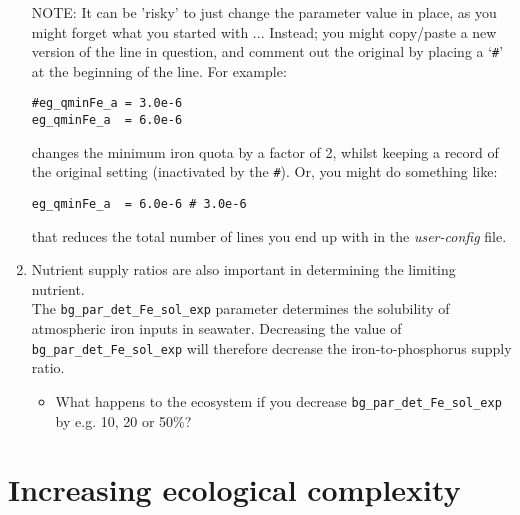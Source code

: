 \documentclass[11pt,fleqn]{book} %
\begin{document}
\begin{enumerate}[noitemsep]
\vspace{1mm}
\item[NOTE:] It can be 'risky' to just change the parameter value in place, as you might forget what you started with ... Instead; you might copy/paste a new version of the line in question, and comment out the original by placing a `\texttt{\#}' at the beginning of the line. For example:
\vspace{-1mm}\small\begin{verbatim}
#eg_qminFe_a = 3.0e-6
eg_qminFe_a  = 6.0e-6
\end{verbatim}\normalsize\vspace{-1mm}
changes the minimum iron quota by a factor of 2, whilst keeping a record of the original setting (inactivated by the \texttt{\#}). Or, you might do something like:
\vspace{-1mm}\small\begin{verbatim}
eg_qminFe_a  = 6.0e-6 # 3.0e-6
\end{verbatim}\normalsize\vspace{-1mm}
that reduces the total number of lines you end up with in the \textit{user-config} file.

\vspace{1mm}
\item Nutrient supply ratios are also important in determining the limiting nutrient.
\\The \texttt{bg\_par\_det\_Fe\_sol\_exp} parameter determines the solubility of atmospheric iron inputs in seawater. Decreasing the value of \texttt{bg\_par\_det\_Fe\_sol\_exp} will therefore decrease the iron-to-phosphorus supply ratio.

\vspace{1mm}
\begin{itemize}
\item What happens to the ecosystem if you decrease \texttt{bg\_par\_det\_Fe\_sol\_exp} by e.g. 10, 20 or 50\%?
\end{itemize}

\end{enumerate}
\vspace{2mm}


\newpage


\section{Increasing ecological complexity}
\end{document}
